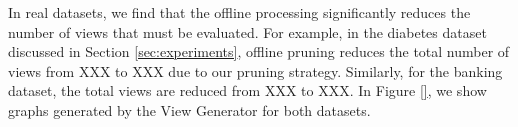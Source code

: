 In real datasets, we find that the offline processing significantly
reduces the number of views that must be evaluated. 
For example, in the
diabetes dataset discussed in Section \ref{sec:experiments}, offline pruning
reduces the total number of views from XXX to XXX due to our pruning
strategy. Similarly, for the banking dataset, the total views are
reduced from XXX to XXX. In Figure \ref{}, we show graphs generated by the
View Generator for both datasets.




